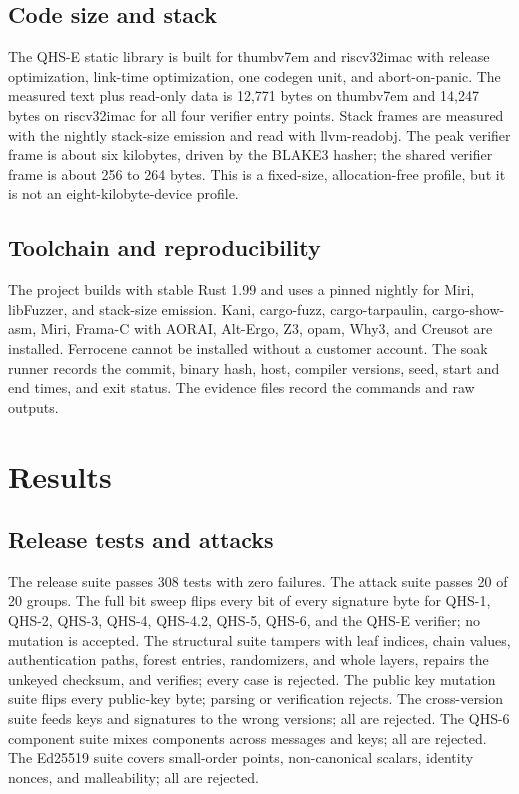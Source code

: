 \documentclass[11pt,a4paper]{article}
\begin{document}
\subsection{Code size and stack}

The QHS-E static library is built for thumbv7em and riscv32imac with release
optimization, link-time optimization, one codegen unit, and abort-on-panic.
The measured text plus read-only data is 12,771 bytes on thumbv7em and 14,247
bytes on riscv32imac for all four verifier entry points. Stack frames are
measured with the nightly stack-size emission and read with llvm-readobj. The
peak verifier frame is about six kilobytes, driven by the BLAKE3 hasher; the
shared verifier frame is about 256 to 264 bytes. This is a fixed-size,
allocation-free profile, but it is not an eight-kilobyte-device profile.

\subsection{Toolchain and reproducibility}

The project builds with stable Rust 1.99 and uses a pinned nightly for Miri,
libFuzzer, and stack-size emission. Kani, cargo-fuzz, cargo-tarpaulin,
cargo-show-asm, Miri, Frama-C with AORAI, Alt-Ergo, Z3, opam, Why3, and
Creusot are installed. Ferrocene cannot be installed without a customer
account. The soak runner records the commit, binary hash, host, compiler
versions, seed, start and end times, and exit status. The evidence files record
the commands and raw outputs.

\section{Results}

\subsection{Release tests and attacks}

The release suite passes 308 tests with zero failures. The attack suite passes
20 of 20 groups. The full bit sweep flips every bit of every signature byte for
QHS-1, QHS-2, QHS-3, QHS-4, QHS-4.2, QHS-5, QHS-6, and the QHS-E verifier; no
mutation is accepted. The structural suite tampers with leaf indices, chain
values, authentication paths, forest entries, randomizers, and whole layers,
repairs the unkeyed checksum, and verifies; every case is rejected. The public
key mutation suite flips every public-key byte; parsing or verification
rejects. The cross-version suite feeds keys and signatures to the wrong
versions; all are rejected. The QHS-6 component suite mixes components across
messages and keys; all are rejected. The Ed25519 suite covers small-order
points, non-canonical scalars, identity nonces, and malleability; all are
rejected.
\end{document}
